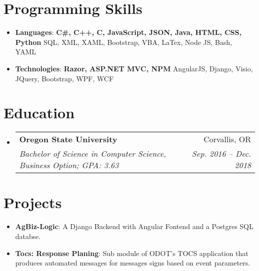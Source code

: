 \documentclass[letterpaper,11pt]{article}
\makeatletter
\newcommand{\resumeItem}[2]{
  \item\small{
    \textbf{#1}{: #2 \vspace{-2pt}}
  }
}
\newcommand{\resumeSubheading}[4]{
  \vspace{-1pt}\item
    \begin{tabular*}{0.97\textwidth}{l@{\extracolsep{\fill}}r}
      \textbf{#1} & #2 \\
      \textit{\small#3} & \textit{\small #4} \\
    \end{tabular*}\vspace{-5pt}
}
\newcommand{\resumeSubItem}[2]{\resumeItem{#1}{#2}\vspace{-4pt}}
\newcommand{\resumeSubHeadingListStart}{\begin{itemize}[leftmargin=*]}
\newcommand{\resumeSubHeadingListEnd}{\end{itemize}}
\makeatother
\begin{document}
\section{Programming Skills}
  \resumeSubHeadingListStart
    \item{
     \textbf{Languages}{: \textbf{C\#, C++, C, JavaScript, JSON, Java, HTML, CSS, Python} SQL, XML, XAML, Bootstrap, VBA, LaTex, Node JS, Bash, YAML}}
     \item{
      \textbf{Technologies}{: \textbf{Razor, ASP.NET MVC, NPM} AngularJS, Django, Visio, JQuery, Bootstrap, WPF, WCF}
    }
  \resumeSubHeadingListEnd

\section{Education}
  \resumeSubHeadingListStart
    \resumeSubheading
      {Oregon State University}{Corvallis, OR}
      {Bachelor of Science in Computer Science, Business Option;  GPA: 3.63}{Sep. 2016 -- Dec. 2018}
  \resumeSubHeadingListEnd

\section{Projects}
  \resumeSubHeadingListStart
    \resumeSubItem{AgBiz-Logic}
      {A Django Backend with Angular Fontend and a Postgres SQL databse.}
    \resumeSubItem{Tocs: Response Planing}
      {Sub module of ODOT's TOCS application that produces automated messages for messages signs based on event parameters.}
  \resumeSubHeadingListEnd
\end{document}
